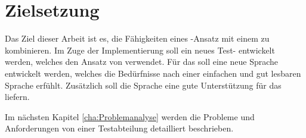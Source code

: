
\section{Zielsetzung}

Das Ziel dieser Arbeit ist es, die Fähigkeiten eines -Ansatz mit einem   zu kombinieren. Im Zuge der Implementierung soll ein neues Test- entwickelt werden, welches den Ansatz von  verwendet. Für das  soll eine neue Sprache entwickelt werden, welches die Bedürfnisse nach einer einfachen und gut lesbaren Sprache erfühlt. Zusätzlich soll die Sprache eine gute Unterstützung für das  liefern.

\SuperPar
Im nächsten Kapitel \ref{cha:Problemanalyse} werden die Probleme und Anforderungen von einer Testabteilung detailliert beschrieben.